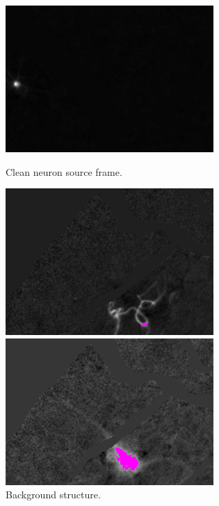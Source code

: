 \documentclass[11pt]{article}
\begin{document}
\begin{figure}[h]
    \centering
    \begin{minipage}{.33\textwidth}
      \centering
      \includegraphics[width=.9\linewidth]{frame_2.png}
      \caption{\footnotesize Clean neuron source frame.}
      \label{fig:test1}
    \end{minipage}%
    \begin{minipage}{.33\textwidth}
      \centering
      \includegraphics[width=.9\linewidth]{frame_3.png}
      \caption{\footnotesize Background structure. }
      \label{fig:test2}
    \end{minipage}
    \begin{minipage}{.33\textwidth}
      \centering
      \includegraphics[width=.9\linewidth]{frame_4.png}

\end{minipage}
\end{figure}
\end{document}
